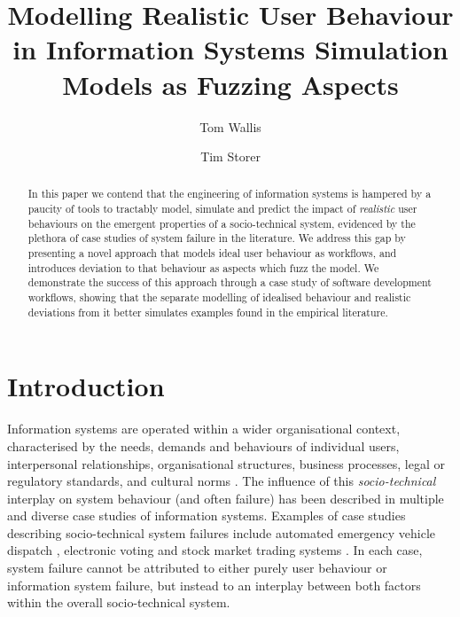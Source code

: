 \documentclass{llncs}
\title{Modelling Realistic User Behaviour in Information Systems Simulation Models as Fuzzing Aspects}
\author{Tom Wallis\orcidID{} \and Tim Storer\orcidID{}}
\institute{University of Glasgow, Glasgow, Scotland,\\
  \email{w.wallis.1@research.gla.ac.uk},\\
  \email{timothy.storer@glasgow.ac.uk},
}
\begin{document}

\maketitle


\begin{abstract}

  In this paper we contend that the engineering of information systems is hampered by a paucity of tools to tractably
  model, simulate and predict the impact of \emph{realistic} user behaviours on the emergent properties of
  a socio-technical system, evidenced by the plethora of case studies of system failure in the literature.  We
  address this gap by presenting a novel approach that models ideal user behaviour as workflows, and introduces
  deviation to that behaviour as aspects which fuzz the model. We demonstrate the success of this approach through a
  case study of software development workflows,  showing that the separate modelling of idealised behaviour and 
  realistic deviations from it better simulates examples found in the empirical literature.
\end{abstract}


\section{Introduction}
\label{sec:introduction}


Information systems are operated within a wider organisational context, characterised by the needs, demands and
behaviours of individual users, interpersonal relationships, organisational structures, business processes, legal or
regulatory standards, and cultural norms \citep{bade07structures,pentland05organisational}.  The
influence of this \emph{socio-technical} interplay on system behaviour (and often failure) has been described in
multiple and diverse case studies of information systems.  Examples of case studies describing socio-technical system
failures include automated emergency vehicle dispatch \citep{robinson96limited}, electronic voting
\citep{lock07observations} and stock market trading systems \citep{cftc-sec10findings}. In each case, system failure
cannot be attributed to either purely user behaviour or information system failure, but instead to an interplay between
both factors within the overall socio-technical system.
\end{document}
